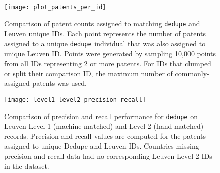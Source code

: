 \documentclass[11pt]{article}
\begin{document}
\begin{figure}[ht]
  \centering
  \texttt{[image: plot\_patents\_per\_id]}
  \caption{Comparison of patent counts assigned to matching
    \texttt{dedupe} and Leuven unique IDs. Each point represents the
    number of patents assigned to a unique \texttt{dedupe} individual
    that was also assigned to unique Leuven ID. Points were generated
    by sampling 10,000 points from all IDs representing 2 or more
    patents. For IDs that clumped
    or split their comparison ID, the maximum number of
    commonly-assigned patents was used.}
  \label{fig:id-patent-counts}
\end{figure}





\begin{figure}[ht]
  \centering
  \texttt{[image: level1\_level2\_precision\_recall]}
  \caption{Comparison of precision and recall performance for
    \texttt{dedupe} on Leuven Level 1 (machine-matched) and Level 2
    (hand-matched) records. Precision and recall values are computed
    for the patents assigned to unique Dedupe and Leuven
    IDs. Countries missing precision and recall data had no
    corresponding Leuven Level 2 IDs in the dataset.}
  \label{fig:l1-l2-pr}
\end{figure}



\end{document}
